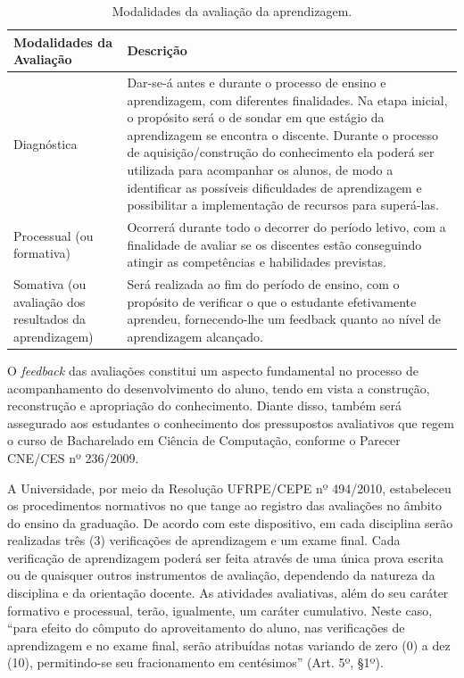 \documentclass[
	12pt,				%
	openright,			%
  oneside,     %
	a4paper,			%
 hyphens,
	chapter=TITLE,		%
	english,			%
	french,				%
	spanish,			%
	brazil				%
	]{abntex2}
\begin{document}
\begin{center}
    \begin{scriptsize}
      \begin{longtable}{p{5cm}p{10cm}}
        \caption{\label{quadro:modalidades_da_avaliacao_da_aprendizagem}Modalidades da avaliação da aprendizagem.}\\
      \toprule
      \textbf{Modalidades da Avaliação} & \textbf{Descrição} \\ 
      \midrule
        Diagnóstica 
                                & Dar-se-á antes e durante o processo de ensino e aprendizagem, com diferentes finalidades. Na etapa inicial, o propósito será o de sondar em que estágio da aprendizagem se encontra o discente. Durante o processo de aquisição/construção do conhecimento ela poderá ser utilizada para acompanhar os alunos, de modo a identificar as possíveis dificuldades de aprendizagem e possibilitar a implementação de recursos para superá-las. \\ \midrule
        Processual (ou formativa)
                                & Ocorrerá durante todo o decorrer do período letivo, com a finalidade de avaliar se os discentes estão conseguindo atingir as competências e habilidades previstas. \\ \midrule
        Somativa (ou avaliação dos resultados da aprendizagem)
                                & Será realizada ao fim do período de ensino, com o propósito de verificar o que o estudante efetivamente aprendeu, fornecendo-lhe um feedback quanto ao nível de aprendizagem alcançado. \\

      \bottomrule
      \end{longtable}
    \end{scriptsize}      
  \end{center}






O \textit{feedback} das avaliações constitui um aspecto fundamental no processo de acompanhamento do desenvolvimento do aluno, tendo em vista a construção, reconstrução e apropriação do conhecimento. Diante disso, também será assegurado aos estudantes o conhecimento dos pressupostos avaliativos que regem o curso de Bacharelado em Ciência de Computação, conforme o Parecer CNE/CES nº 236/2009.
	
A Universidade, por meio da Resolução UFRPE/CEPE nº 494/2010, estabeleceu os procedimentos normativos no que tange ao registro das avaliações no âmbito do ensino da graduação. De acordo com este dispositivo, em cada disciplina serão realizadas três (3) verificações de aprendizagem e um exame final. Cada verificação de aprendizagem poderá ser feita através de uma única prova escrita ou de quaisquer outros instrumentos de avaliação, dependendo da natureza da disciplina e da orientação docente. As atividades avaliativas, além do seu caráter formativo e processual, terão, igualmente, um caráter cumulativo. Neste caso, “para efeito do cômputo do aproveitamento do aluno, nas verificações de aprendizagem e no exame final, serão atribuídas notas variando de zero (0) a dez (10), permitindo-se seu fracionamento em centésimos” (Art. 5º, §1º).
\end{document}
